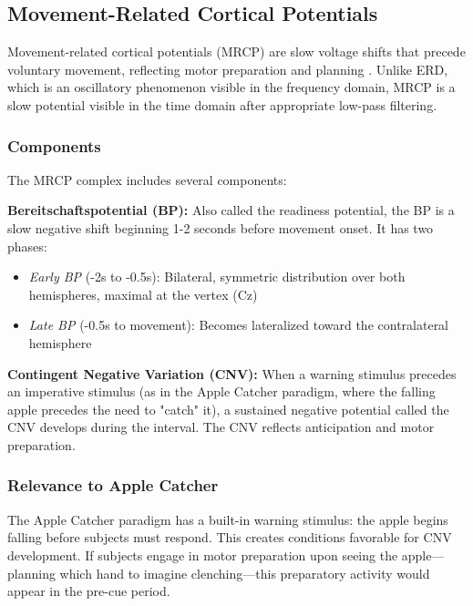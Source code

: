 \subsection{Movement-Related Cortical Potentials}
\label{subsec:bg_mrcp}

Movement-related cortical potentials (MRCP) are slow voltage shifts that precede voluntary movement, reflecting motor preparation and planning \cite{shibasaki2006bereitschaftspotential}. Unlike ERD, which is an oscillatory phenomenon visible in the frequency domain, MRCP is a slow potential visible in the time domain after appropriate low-pass filtering.

\subsubsection{Components}

The MRCP complex includes several components:

\textbf{Bereitschaftspotential (BP):} Also called the readiness potential, the BP is a slow negative shift beginning 1-2 seconds before movement onset. It has two phases:
\begin{itemize}
    \item \textit{Early BP} (-2s to -0.5s): Bilateral, symmetric distribution over both hemispheres, maximal at the vertex (Cz)
    \item \textit{Late BP} (-0.5s to movement): Becomes lateralized toward the contralateral hemisphere
\end{itemize}

\textbf{Contingent Negative Variation (CNV):} When a warning stimulus precedes an imperative stimulus (as in the Apple Catcher paradigm, where the falling apple precedes the need to "catch" it), a sustained negative potential called the CNV develops during the interval. The CNV reflects anticipation and motor preparation.

\subsubsection{Relevance to Apple Catcher}

The Apple Catcher paradigm has a built-in warning stimulus: the apple begins falling before subjects must respond. This creates conditions favorable for CNV development. If subjects engage in motor preparation upon seeing the apple—planning which hand to imagine clenching—this preparatory activity would appear in the pre-cue period.

